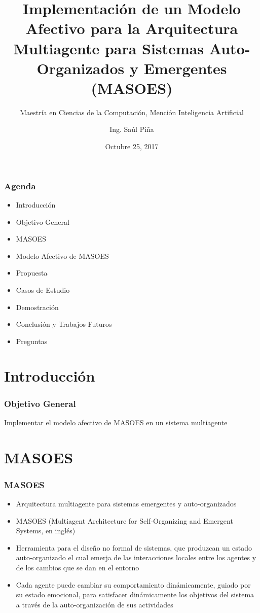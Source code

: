 \documentclass{beamer}
\title{Implementación de un Modelo Afectivo para la Arquitectura Multiagente para Sistemas Auto-Organizados y Emergentes (MASOES)}
\subtitle{Maestría en Ciencias de la Computación, Mención Inteligencia Artificial}
\author{Ing. Saúl Piña}
\date{Octubre 25, 2017}
\institute{\url{sauljabin@gmail.com}}
\begin{document}
\begin{frame}[plain,t]
\titlepage
\end{frame}

\begin{frame}
\frametitle{Agenda}
\begin{itemize}
\item Introducción
\item Objetivo General
\item MASOES
\item Modelo Afectivo de MASOES
\item Propuesta
\item Casos de Estudio
\item Demostración
\item Conclusión y Trabajos Futuros
\item Preguntas
\end{itemize}
\end{frame}

\section{Introducción}

\begin{frame}
\frametitle{Objetivo General}
\huge
Implementar el modelo afectivo de MASOES en un sistema multiagente
\end{frame}

\section{MASOES}

\begin{frame}
\frametitle{MASOES}
\begin{itemize}
	\item Arquitectura multiagente para sistemas emergentes y auto-organizados
	\item MASOES (Multiagent Architecture for Self-Organizing and Emergent Systems, en inglés)
  \item Herramienta para el diseño no
  formal de sistemas, que produzcan un estado auto-organizado el cual emerja de
  las interacciones locales entre los agentes y de los cambios que se dan en el
  entorno
  \item Cada agente puede cambiar su comportamiento
  dinámicamente, guiado por su estado emocional, para satisfacer dinámicamente los
  objetivos del sistema a través de la auto-organización de sus actividades
\end{itemize}
\end{frame}
\end{document}
